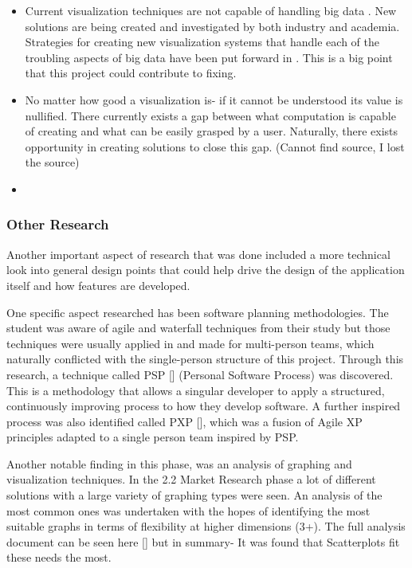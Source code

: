 \begin{itemize}
    \item Current visualization techniques are not capable of handling big data \cite[]{7918044}. New solutions are being created and investigated by both industry and academia. Strategies for creating new visualization systems that handle each of the troubling aspects of big data have been put forward in \cite[]{9523950}. This is a big point that this project could contribute to fixing.
    \item No matter how good a visualization is- if it cannot be understood its value is nullified. There currently exists a gap between what computation is capable of creating and what can be easily grasped by a user. Naturally, there exists opportunity in creating solutions to close this gap. (Cannot find source, I lost the source)
    \item
\end{itemize}

\subsubsection{Other Research}
Another important aspect of research that was done included a more technical look into general design points that could help drive the design of the application itself and how features are developed.

One specific aspect researched has been software planning methodologies. The student was aware of agile and waterfall techniques from their study but those techniques were usually applied in and made for multi-person teams, which naturally conflicted with the single-person structure of this project. Through this research, a technique called PSP [] (Personal Software Process) was discovered. This is a methodology that allows a singular developer to apply a structured, continuously improving process to how they develop software. A further inspired process was also identified called PXP [], which was a fusion of Agile XP principles adapted to a single person team inspired by PSP.

Another notable finding in this phase, was an analysis of graphing and visualization techniques. In the 2.2 Market Research phase a lot of different solutions with a large variety of graphing types were seen. An analysis of the most common ones was undertaken with the hopes of identifying the most suitable graphs in terms of flexibility at higher dimensions (3+). The full analysis document can be seen here [] but in summary- It was found that Scatterplots fit these needs the most.

